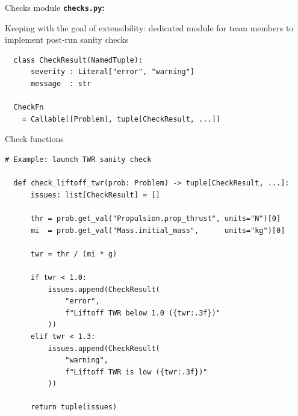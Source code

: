 \begin{frame}[fragile]{Checks module}
  \textbf{\texttt{checks.py}:}

  \vspace{\baselineskip}

  Keeping with the goal of extensibility: dedicated module for team members to
  implement post-run sanity checks

  \vspace{\baselineskip}

  \begin{lstlisting}
  class CheckResult(NamedTuple):
      severity : Literal["error", "warning"]
      message  : str

  CheckFn
    = Callable[[Problem], tuple[CheckResult, ...]]
  \end{lstlisting}
\end{frame}

\begin{frame}[fragile]{Check functions}
  \begin{lstlisting}[basicstyle=\ttfamily\tiny]
  # Example: launch TWR sanity check

  def check_liftoff_twr(prob: Problem) -> tuple[CheckResult, ...]:
      issues: list[CheckResult] = []

      thr = prob.get_val("Propulsion.prop_thrust", units="N")[0]
      mi  = prob.get_val("Mass.initial_mass",      units="kg")[0]

      twr = thr / (mi * g)

      if twr < 1.0:
          issues.append(CheckResult(
              "error",
              f"Liftoff TWR below 1.0 ({twr:.3f})"
          ))
      elif twr < 1.3:
          issues.append(CheckResult(
              "warning",
              f"Liftoff TWR is low ({twr:.3f})"
          ))

      return tuple(issues)
  \end{lstlisting}
\end{frame}
